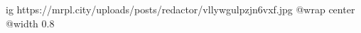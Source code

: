  
 
 
 
 

\ifcmt
  ig https://mrpl.city/uploads/posts/redactor/vllywgulpzjn6vxf.jpg
  @wrap center
  @width 0.8
\fi
